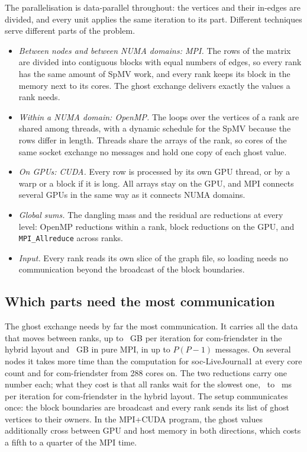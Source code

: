 \documentclass[11pt,a4paper]{article}
\newcommand{\code}[1]{\texttt{#1}}
\begin{document}
The parallelisation is data-parallel throughout: the vertices and their in-edges are divided, and every unit
applies the same iteration to its part. Different techniques serve different parts of the problem.
\begin{itemize}
\item \emph{Between nodes and between NUMA domains: MPI.} The rows of the matrix are divided into contiguous blocks
  with equal numbers of edges, so every rank has the same amount of SpMV work, and every rank keeps its block in
  the memory next to its cores. The ghost exchange delivers exactly the values a rank needs.
\item \emph{Within a NUMA domain: OpenMP.} The loops over the vertices of a rank are shared among threads, with a
  dynamic schedule for the SpMV because the rows differ in length. Threads share the arrays of the rank, so cores
  of the same socket exchange no messages and hold one copy of each ghost value.
\item \emph{On GPUs: CUDA.} Every row is processed by its own GPU thread, or by a warp or a block if it is long.
  All arrays stay on the GPU, and MPI connects several GPUs in the same way as it connects NUMA domains.
\item \emph{Global sums.} The dangling mass and the residual are reductions at every level: OpenMP reductions
  within a rank, block reductions on the GPU, and \code{MPI\_Allreduce} across ranks.
\item \emph{Input.} Every rank reads its own slice of the graph file, so loading needs no communication beyond the
  broadcast of the block boundaries.
\end{itemize}

\subsection{Which parts need the most communication}

The ghost exchange needs by far the most communication. It carries all the data that moves between ranks, up to
\cmFRhyVolGB~GB per iteration for com-friendster in the hybrid layout and \cmFRmpVolGB~GB in pure MPI, in up to
$P(P-1)$ messages. On several nodes it takes more time than the computation for soc-LiveJournal1 at every core
count and for com-friendster from 288 cores on. The two reductions carry one number each; what they cost is
that all ranks wait for the slowest one, \spFRwaitMin\ to \spFRwaitMax~ms per iteration for com-friendster in the
hybrid layout. The setup
communicates once: the block boundaries are broadcast and every rank sends its list of ghost vertices to their
owners. In the MPI+CUDA program, the ghost values additionally cross between GPU and host memory in both
directions, which costs a fifth to a quarter of the MPI time.
\end{document}
